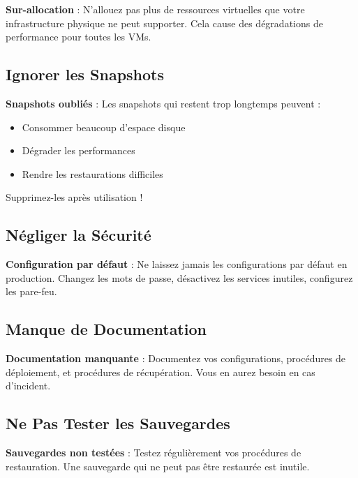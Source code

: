 \documentclass[11pt,a4paper]{article}
\begin{document}
\begin{dangerbox}
\textbf{Sur-allocation} : N'allouez pas plus de ressources virtuelles que votre infrastructure physique ne peut supporter. Cela cause des dégradations de performance pour toutes les VMs.
\end{dangerbox}

\subsection{Ignorer les Snapshots}

\begin{dangerbox}
\textbf{Snapshots oubliés} : Les snapshots qui restent trop longtemps peuvent :
\begin{itemize}
    \item Consommer beaucoup d'espace disque
    \item Dégrader les performances
    \item Rendre les restaurations difficiles
\end{itemize}
Supprimez-les après utilisation !
\end{dangerbox}

\subsection{Négliger la Sécurité}

\begin{dangerbox}
\textbf{Configuration par défaut} : Ne laissez jamais les configurations par défaut en production. Changez les mots de passe, désactivez les services inutiles, configurez les pare-feu.
\end{dangerbox}

\subsection{Manque de Documentation}

\begin{dangerbox}
\textbf{Documentation manquante} : Documentez vos configurations, procédures de déploiement, et procédures de récupération. Vous en aurez besoin en cas d'incident.
\end{dangerbox}

\subsection{Ne Pas Tester les Sauvegardes}

\begin{dangerbox}
\textbf{Sauvegardes non testées} : Testez régulièrement vos procédures de restauration. Une sauvegarde qui ne peut pas être restaurée est inutile.
\end{dangerbox}
\end{document}
